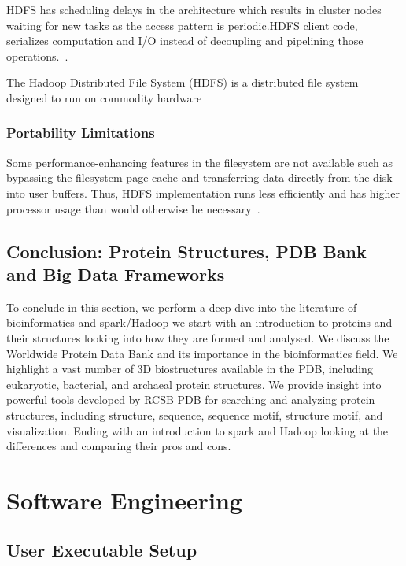 \documentclass[]{final_report}
\begin{document}
HDFS has scheduling delays in the architecture which results in cluster nodes waiting for new tasks as the access pattern is periodic.HDFS client code, serializes computation and I/O instead of decoupling and pipelining those operations.~\cite{shafer_hadoop_2010}.

\begin{definition}[HDFS]
    The Hadoop Distributed File System (HDFS) is a distributed file system designed to run on commodity hardware
\end{definition}

\subsubsection{Portability Limitations}
Some performance-enhancing features in the filesystem are not available such as bypassing the filesystem page cache and transferring data directly from the disk into user buffers. Thus, HDFS implementation runs less efficiently and has higher processor usage than would otherwise be necessary~\cite{shafer_hadoop_2010}.
\clearpage

\subsection{Conclusion: Protein Structures, PDB Bank and Big Data Frameworks }
To conclude in this section, we perform a deep dive into the literature of bioinformatics and spark/Hadoop we start with an introduction to proteins and their structures looking into how they are formed and analysed. We discuss the Worldwide Protein Data Bank and its importance in the bioinformatics field. We highlight a vast number of 3D biostructures available in the PDB, including eukaryotic, bacterial, and archaeal protein structures. We provide insight into powerful tools developed by RCSB PDB for searching and analyzing protein structures, including structure, sequence, sequence motif, structure motif, and visualization. Ending with an introduction to spark and Hadoop looking at the differences and comparing their pros and cons.

\section{Software Engineering}

\subsection{User Executable Setup}
\end{document}
